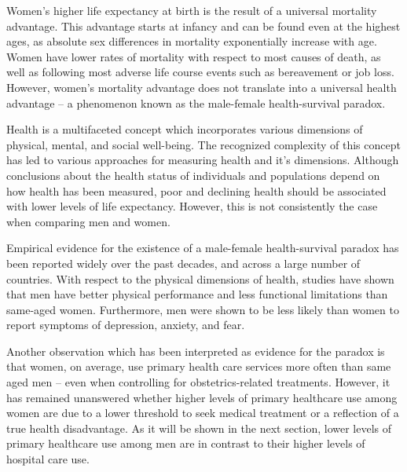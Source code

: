 Women's higher life expectancy at birth is the result of a universal 
mortality advantage. This advantage starts at infancy and can be found 
even at the highest ages, as absolute sex differences in mortality 
exponentially increase with age.\citep{carter1992modeling,gjonca2005,wisser2014sex} 
Women have lower rates of mortality with respect to most causes of death, 
as well as following most adverse life course events such as bereavement 
or job loss.\citep{martikainen1996excess,shor2012widowhood} However, 
women's mortality advantage does not translate into a universal health 
advantage -- a phenomenon known as the male-female health-survival 
paradox.\citep{oksuzyan2008,hubbard2011frailty}

Health is a multifaceted concept which incorporates various dimensions 
of physical, mental, and social well-being.\citep{who1946constitution} 
The recognized complexity of this concept has led to various approaches 
for measuring health and it's dimensions.\citep{mcdowell2006measuring} 
Although conclusions about the health status of individuals and populations 
depend on how health has been measured,\citep{patrick1989generic,ware1987standards} 
poor and declining health should be associated with lower levels of life 
expectancy.\citep{lee2000predictive,sasaki2007grip} However, this is not 
consistently the case when comparing men and women.

Empirical evidence for the existence of a male-female health-survival 
paradox has been reported widely over the past decades, and across a large 
number of countries.\citep{bambra2009gender,oksuzyan2010,nusselder2010gender,van2013gender} 
With respect to the physical dimensions of health, studies have shown 
that men have better physical performance and less functional limitations 
than same-aged women.\citep{nybo2001functional,oksuzyan2008,oksuzyan2010} 
Furthermore, men were shown to be less likely than women to report 
symptoms of depression, anxiety, and fear.\citep{mclean2011gender}

Another observation which has been interpreted as evidence for the paradox 
is that women, on average, use primary health care services more often 
than same aged men -- even when controlling for obstetrics-related 
treatments.\citep{wang2013men} However, it has remained unanswered whether 
higher levels of primary healthcare use among women are due to a lower 
threshold to seek medical treatment or a reflection of a true health 
disadvantage.\citep{hunt2011women,case2005sex} As it will be shown 
in the next section, lower levels of primary healthcare use among 
men are in contrast to their higher levels of hospital care use. 

